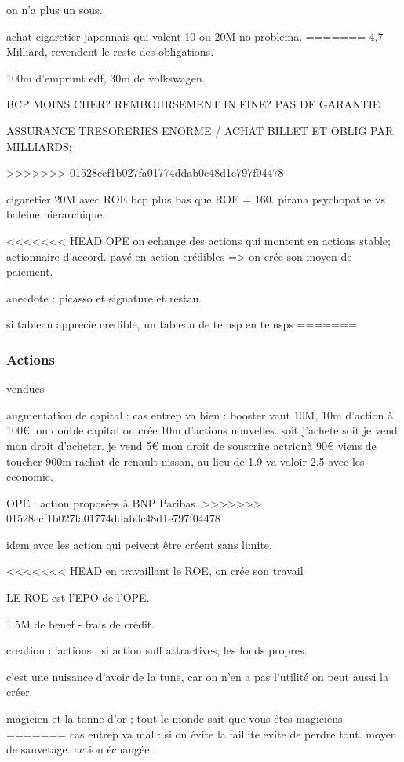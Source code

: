 \documentclass[a4paper,12pt]{article}
\begin{document}
on n'a plus un sous.

achat cigaretier japonnais qui valent 10 ou 20M no problema.
=======
4,7 Milliard, revendent le reste des obligations.

100m d'emprunt edf, 30m de volkswagen.

BCP MOINS CHER? REMBOURSEMENT IN FINE? PAS DE GARANTIE

ASSURANCE TRESORERIES ENORME / ACHAT BILLET ET OBLIG PAR MILLIARDS;

>>>>>>> 01528ccf1b027fa01774ddab0c48d1e797f04478

cigaretier 20M avec ROE bcp plus bas que ROE = 160.
pirana psychopathe vs baleine hierarchique.

<<<<<<< HEAD
OPE on echange des actions qui montent en actions stable; actionnaire d'accord.
payé en action crédibles => on crée son moyen de paiement.

anecdote : picasso et signature et restau.

si tableau apprecie credible, un tableau de temsp en temsps
=======
\subsubsection{Actions}
vendues 

augmentation de capital : cas entrep va bien : booster
vaut 10M, 10m d'action à 100€. on double capital on crée 10m d'actions nouvelles.
soit j'achete soit je vend mon droit d'acheter. je vend 5€ mon droit de souscrire actrionà 90€
viens de toucher 900m rachat de renault nissan, au lieu de 1.9 va valoir 2.5 avec les economie.

OPE : action proposées à BNP Paribas.
>>>>>>> 01528ccf1b027fa01774ddab0c48d1e797f04478

idem avce les action qui peivent être créent sans limite.

<<<<<<< HEAD
en travaillant le ROE, on crée son travail

LE ROE est l'EPO de l'OPE.

1.5M de benef - frais de crédit.

creation d'actions : si action suff attractives, les fonds propres.

c'est une nuisance d'avoir de la tune, car on n'en a pas l'utilité on peut aussi la créer. 

magicien et la tonne d'or ; tout le monde sait que vous êtes magiciens.
=======
cas entrep va mal : si on évite la faillite evite de perdre tout. moyen de sauvetage.
action échangée.
\end{document}

